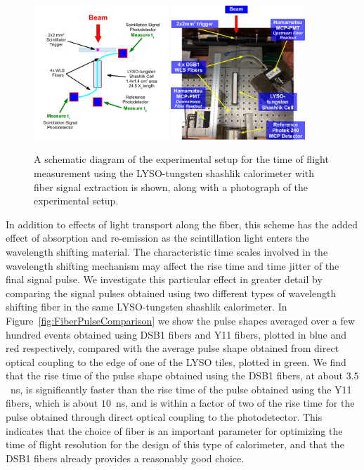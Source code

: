 \documentclass[11pt]{article}
\begin{document}
\begin{figure}[h] \centering
\includegraphics[width=0.45\textwidth]{figs/ShashlikFiberSetupSchematic} 
\includegraphics[width=0.45\textwidth]{figs/ShashlikFiberSetupPhoto} 
\caption{ A schematic diagram of the experimental setup for the
time of flight measurement using the LYSO-tungsten shashlik calorimeter
with fiber signal extraction is shown, along with a photograph of the
experimental setup. } 
\label{fig:ShashlikFiberSetup}
\end{figure}

In addition to effects of light transport along the fiber, 
this scheme has the added effect of absorption and re-emission as 
the scintillation light enters the wavelength shifting material. 
The characteristic time scales involved in the wavelength shifting 
mechanism may affect the rise time and time jitter of the final signal 
pulse. We investigate this particular effect in greater detail by
comparing the signal pulses obtained using two different types
of wavelength shifting fiber in the same LYSO-tungsten shashlik
calorimeter. In Figure~\ref{fig:FiberPulseComparison} we show
the pulse shapes averaged over a few hundred events obtained 
using DSB1 fibers and Y11 fibers, plotted in blue and red respectively,
compared with the average pulse shape obtained from direct optical 
coupling to the edge of one of the LYSO tiles, plotted in green.
We find that the rise time of the pulse shape obtained using the 
DSB1 fibers, at about $3.5$~ns, is significantly faster than the rise time
of the pulse obtained using the Y11 fibers, which is about $10$~ns,
and is within a factor of two of the rise time for the pulse obtained 
through direct optical coupling to the photodetector. This indicates
that the choice of fiber is an important parameter for 
optimizing the time of flight resolution for the design of 
this type of calorimeter, and that the DSB1 fibers 
already provides a reasonably good choice.
\end{document}
